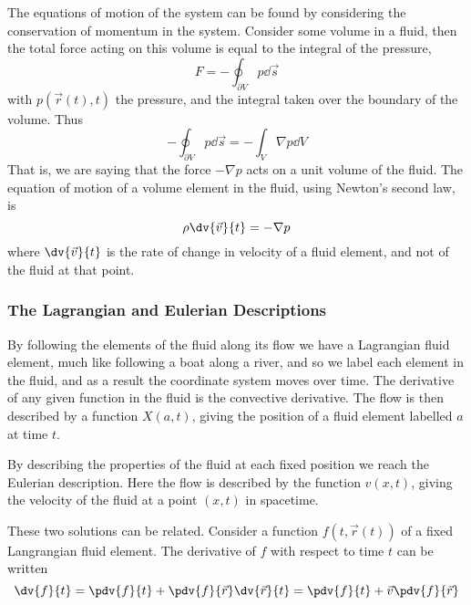 The equations of motion of the system can be found by considering the
conservation of momentum in the system. Consider some volume in a
fluid, then the total force acting on this volume is equal to the
integral of the pressure,
\begin{equation}
  \label{eq:7}
  F = - \oint_{\partial V} p \dd{\vec{s}}
\end{equation}
with $p(\vec{r}(t), t)$ the pressure, and the integral taken over the
boundary of the volume. Thus
\begin{equation}
  \label{eq:8}
  - \oint_{\partial V} p \dd{\vec{s}} = - \int_V \nabla p \dd{V}
\end{equation}
That is, we are saying that the force $- \nabla p$ acts on a unit
volume of the fluid. The equation of motion of a volume element in the
fluid, using Newton's second law, is
\begin{equation}
  \label{eq:9}
  \rho \dv{\vec{v}}{t} = - \nabla p
\end{equation}
where $\dv{\vec{v}}{t}$ is the rate of change in velocity of a fluid
element, and not of the fluid at that point.

\subsubsection{The Lagrangian and Eulerian Descriptions}
\label{sec:lagr-euler-descr}

By following the elements of the fluid along its flow we have a
Lagrangian fluid element, much like following a boat along a river,
and so we label each element in the fluid, and as a result the
coordinate system moves over time. The derivative of any given
function in the fluid is the convective derivative. The flow is then
described by a function $X(a, t)$, giving the position of a fluid
element labelled $a$ at time $t$.

By describing the properties of the fluid at each fixed position we
reach the Eulerian description. Here the flow is described by the
function $v(x,t)$, giving the velocity of the fluid at a point $(x,t)$
in spacetime.

These two solutions can be related. Consider a function $f(t,
\vec{r}(t))$ of a fixed Langrangian fluid element. The derivative of
$f$ with respect to time $t$ can be written
\begin{equation}
  \label{eq:10}
  \dv{f}{t} = \pdv{f}{t} + \pdv{f}{\vec{r}} \dv{\vec{r}}{t} 
            = \pdv{f}{t} + \vec{v} \pdv{f}{\vec{r}}
\end{equation}

